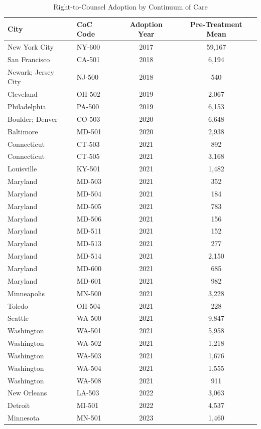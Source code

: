 \begin{table}[htbp]
\centering
\caption{Right-to-Counsel Adoption by Continuum of Care}
\label{tab:adoption}
\begin{tabular}{llcc}
\hline\hline
City & CoC Code & Adoption Year & Pre-Treatment Mean \\
\hline
New York City & NY-600 & 2017 & 59,167 \\
San Francisco & CA-501 & 2018 & 6,194 \\
Newark; Jersey City & NJ-500 & 2018 & 540 \\
Cleveland & OH-502 & 2019 & 2,067 \\
Philadelphia & PA-500 & 2019 & 6,153 \\
Boulder; Denver & CO-503 & 2020 & 6,648 \\
Baltimore & MD-501 & 2020 & 2,938 \\
Connecticut & CT-503 & 2021 & 892 \\
Connecticut & CT-505 & 2021 & 3,168 \\
Louisville & KY-501 & 2021 & 1,482 \\
Maryland & MD-503 & 2021 & 352 \\
Maryland & MD-504 & 2021 & 184 \\
Maryland & MD-505 & 2021 & 783 \\
Maryland & MD-506 & 2021 & 156 \\
Maryland & MD-511 & 2021 & 152 \\
Maryland & MD-513 & 2021 & 277 \\
Maryland & MD-514 & 2021 & 2,150 \\
Maryland & MD-600 & 2021 & 685 \\
Maryland & MD-601 & 2021 & 982 \\
Minneapolis & MN-500 & 2021 & 3,228 \\
Toledo & OH-504 & 2021 & 228 \\
Seattle & WA-500 & 2021 & 9,847 \\
Washington & WA-501 & 2021 & 5,958 \\
Washington & WA-502 & 2021 & 1,218 \\
Washington & WA-503 & 2021 & 1,676 \\
Washington & WA-504 & 2021 & 1,555 \\
Washington & WA-508 & 2021 & 911 \\
New Orleans & LA-503 & 2022 & 3,063 \\
Detroit & MI-501 & 2022 & 4,537 \\
Minnesota & MN-501 & 2023 & 1,460 \\

\end{tabular}
\end{table}
